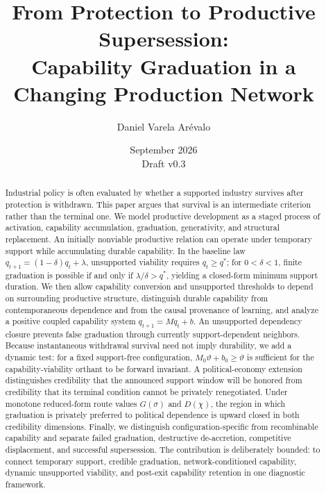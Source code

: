 \documentclass[11pt]{article}
\title{\textbf{From Protection to Productive Supersession:}\\
Capability Graduation in a Changing Production Network}
\author{Daniel Varela Ar\'evalo}
\date{September 2026\\\small Draft v0.3}
\newcommand{\1}{\mathbf{1}}
\begin{document}
\maketitle

\begin{abstract}
Industrial policy is often evaluated by whether a supported industry survives after protection is withdrawn. This paper argues that survival is an intermediate criterion rather than the terminal one. We model productive development as a staged process of activation, capability accumulation, graduation, generativity, and structural replacement. An initially nonviable productive relation can operate under temporary support while accumulating durable capability. In the baseline law $q_{t+1}=(1-\delta)q_t+\lambda$, unsupported viability requires $q_t\ge q^*$; for $0<\delta<1$, finite graduation is possible if and only if $\lambda/\delta>q^*$, yielding a closed-form minimum support duration. We then allow capability conversion and unsupported thresholds to depend on surrounding productive structure, distinguish durable capability from contemporaneous dependence and from the causal provenance of learning, and analyze a positive coupled capability system $q_{t+1}=Mq_t+b$. An unsupported dependency closure prevents false graduation through currently support-dependent neighbors. Because instantaneous withdrawal survival need not imply durability, we add a dynamic test: for a fixed support-free configuration, $M_0\vartheta+b_0\ge\vartheta$ is sufficient for the capability-viability orthant to be forward invariant. A political-economy extension distinguishes credibility that the announced support window will be honored from credibility that its terminal condition cannot be privately renegotiated. Under monotone reduced-form route values $G(\sigma)$ and $D(\chi)$, the region in which graduation is privately preferred to political dependence is upward closed in both credibility dimensions. Finally, we distinguish configuration-specific from recombinable capability and separate failed graduation, destructive de-accretion, competitive displacement, and successful supersession. The contribution is deliberately bounded: to connect temporary support, credible graduation, network-conditioned capability, dynamic unsupported viability, and post-exit capability retention in one diagnostic framework.
\end{abstract}












\end{document}
